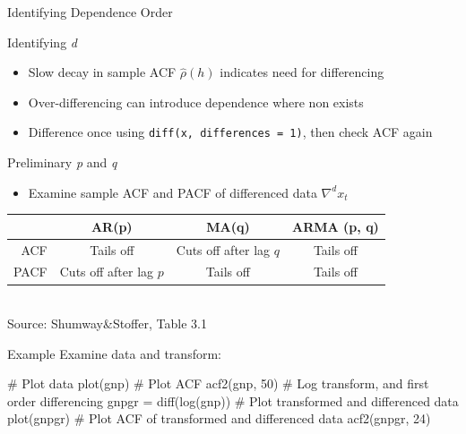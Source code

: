 \documentclass[ignorenonframetext,xcolor=x11names]{beamer}
\begin{document}
\begin{frame}{Identifying Dependence Order}
\small
\begin{block}{Identifying \emph{d}}
\begin{itemize}
   \item Slow decay in sample ACF $\hat\rho(h)$ indicates need for differencing
   \item Over-differencing can introduce dependence where non exists
   \item Difference once using \texttt{diff(x, differences = 1)}, then check ACF again
\end{itemize}
\end{block}

\begin{block}{Preliminary \emph{p} and \emph{q}}
\begin{itemize}
   \item Examine sample ACF and PACF of differenced data $\nabla^d x_t$
\end{itemize}
\vspace{.5\baselineskip} 
\renewcommand{\arraystretch}{1.5}
\begin{tabular}{r|c|c|c} \hline
 & AR(p) & MA(q) & ARMA (p, q) \\ \hline
 ACF & Tails off & Cuts off after lag $q$ & Tails off \\
 PACF & Cuts off after lag $p$ & Tails off & Tails off \\ \hline
\end{tabular} \\
\vspace{.5\baselineskip}
\scriptsize Source: Shumway\&Stoffer, Table 3.1 \normalsize
\end{block}
\end{frame}

\begin{frame}[fragile]{Example}
Examine data and transform:
\begin{Rcode}
# Plot data
plot(gnp)
# Plot ACF
acf2(gnp, 50)
# Log transform, and first order differencing
gnpgr = diff(log(gnp))
# Plot transformed and differenced data
plot(gnpgr)
# Plot ACF of transformed and differenced data
acf2(gnpgr, 24)
\end{Rcode}
\end{frame}
\end{document}
